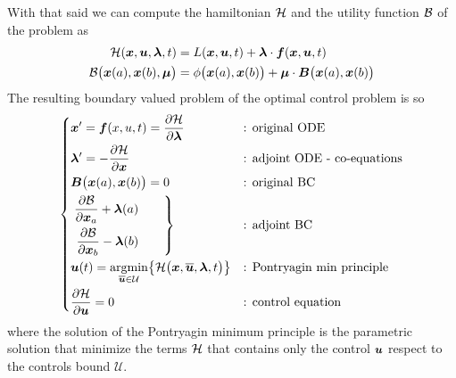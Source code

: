 	With that said we can compute the hamiltonian $\mathcal{H}$ and the utility function $\mathcal{B}$ of the problem as
	\begin{align*}
		\mathcal{H}(\boldsymbol{x}, \boldsymbol{u}, \boldsymbol{\lambda},t) & = L(\boldsymbol{x}, \boldsymbol{u}, t) + \boldsymbol{\lambda}\cdot \boldsymbol{f}(\boldsymbol{x}, \boldsymbol{u}, t) \\
		\mathcal{B}\big(\boldsymbol{x}(a),\boldsymbol{x}(b),\boldsymbol{\mu}\big) & = \phi\big(\boldsymbol{x}(a), \boldsymbol{x}(b) \big) + \boldsymbol{\mu} \cdot \boldsymbol{B}\big(\boldsymbol{x}(a),\boldsymbol{x}(b)\big)  
	\end{align*}
	The resulting boundary valued problem of the optimal control problem is so
	\[
	\left\{ \begin{aligned}
		& \boldsymbol{x}' = \boldsymbol{f}(x,u,t) = \frac{\partial \mathcal H}{\partial \boldsymbol{\lambda}} && \textrm{: original ODE} \\
		&\boldsymbol{\lambda}' = - \frac{\partial \mathcal H}{\partial \boldsymbol{x}} && \textrm{: adjoint ODE - co-equations} \\
		&\boldsymbol{B}\big(\boldsymbol{x}(a),\boldsymbol{x}(b)\big) = 0 && \textrm{: original BC} \\
		&\left. \begin{aligned}
			\frac{\partial \mathcal{B}}{\partial \boldsymbol{x}_a} + \boldsymbol{\lambda}(a) \\
			\frac{\partial \mathcal{B}}{\partial \boldsymbol{x}_b} - \boldsymbol{\lambda}(b)
		\end{aligned} \qquad \right\} &&\textrm{: adjoint BC} \\
		& \boldsymbol{u}(t) = \underset{\overline{\boldsymbol{u}} \in \mathcal U}{\textrm{argmin}} \big\{ \mathcal{H}\big(\boldsymbol{x}, \overline{\boldsymbol{u}},\boldsymbol{\lambda}, t\big) \big\} && \textrm{: Pontryagin min principle} \\
		& \frac{\partial \mathcal H}{\partial \boldsymbol{u}} = 0 && \textrm{: control equation}			
	\end{aligned} \right. \]
	where the solution of the Pontryagin minimum principle is the parametric solution that minimize the terms $\mathcal{H}$ that contains only the control $\boldsymbol{u}$ respect to the controls bound $\mathcal U$. 
	
	
	
	
	
	
	
	
	
	
	
	
	
	
	


